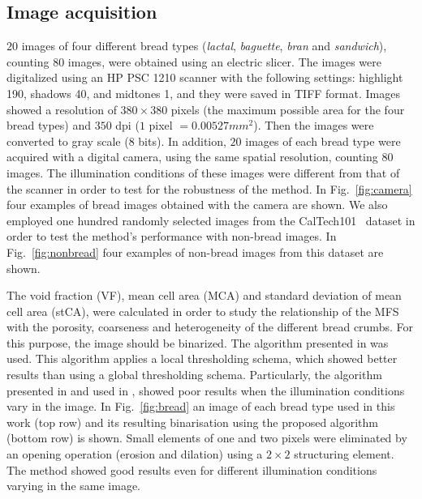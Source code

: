 \subsection{Image acquisition}
\label{sec:7}
$20$ images of four different bread types ({\em lactal}, {\em baguette}, {\em bran} and {\em sandwich}), counting $80$ images, were obtained using an electric slicer. The images were digitalized using an HP PSC 1210 scanner with the following settings: highlight 190, shadows 40, and midtones 1, and they were saved in TIFF format. Images showed a resolution of $380 \times 380$ pixels (the maximum possible area for the four bread types) and $350$ dpi ($1$ pixel $= 0.00527 mm^{2}$). Then the images were converted to gray scale ($8$ bits). In addition, $20$ images of each bread type were acquired with a digital camera, using the same spatial resolution, counting $80$ images. The illumination conditions of these images were different from that of the scanner in order to test for the robustness of the method. In Fig.~\ref{fig:camera} four examples of bread images obtained with the camera are shown. We also employed one hundred randomly selected images from the CalTech101~\cite{FeiFei04} dataset in order to test the method's performance with non-bread images. In Fig.~\ref{fig:nonbread} four examples of non-bread images from this dataset are shown. 

The void fraction (VF), mean cell area (MCA) and standard deviation of mean cell area (stCA), were calculated in order to study the relationship of the MFS with the porosity, coarseness and heterogeneity of the different bread crumbs. For this purpose, the image should be binarized. The algorithm presented in \cite{White83} was used. This algorithm applies a local thresholding schema, which showed better results than using a global thresholding schema. Particularly, the algorithm presented in \cite{Huang95} and used in \cite{Gonzales2008}, showed poor results when the illumination conditions vary in the image. In Fig.~\ref{fig:bread} an image of each bread type used in this work (top row) and its resulting binarisation using the proposed algorithm (bottom row) is shown. Small elements of one and two pixels were eliminated by an opening operation (erosion and dilation) using a $2\times2$ structuring element. The method showed good results even for different illumination conditions varying in the same image. 

